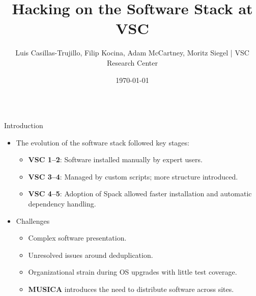 \documentclass[final]{beamer}
\title{Hacking on the Software Stack at VSC}
\author{Luis Casillas-Trujillo, Filip Kocina, Adam McCartney, Moritz Siegel
\quad | \quad VSC Research Center}
\date{\today}
\begin{document}
\begin{frame}[t]

\begin{center}
  \vspace{1cm}
  \Huge \textbf{\inserttitle}
  
  \vspace{0.5cm}
  \Large \insertauthor
  
  \vspace{1cm}
\end{center}

\begin{columns}[t]
  \begin{column}{0.33\textwidth}
    \begin{block}{Introduction}
     \begin{itemize}
      \item The evolution of the software stack followed key stages:
      \begin{itemize}
        \item \textbf{VSC 1–2}: Software installed manually by expert users.
        \item \textbf{VSC 3–4}: Managed by custom scripts; more structure introduced.
        \item \textbf{VSC 4–5}: Adoption of Spack allowed faster installation and automatic dependency handling.
      \end{itemize}
      \item Challenges
      \begin{itemize}
        \item Complex software presentation.
        \item Unresolved issues around deduplication.
        \item Organizational strain during OS upgrades with little test coverage.
        \item \textbf{MUSICA} introduces the need to distribute software across sites.
      \end{itemize}
     \end{itemize}
    \end{block}


\end{column}
\end{columns}
\end{frame}
\end{document}

